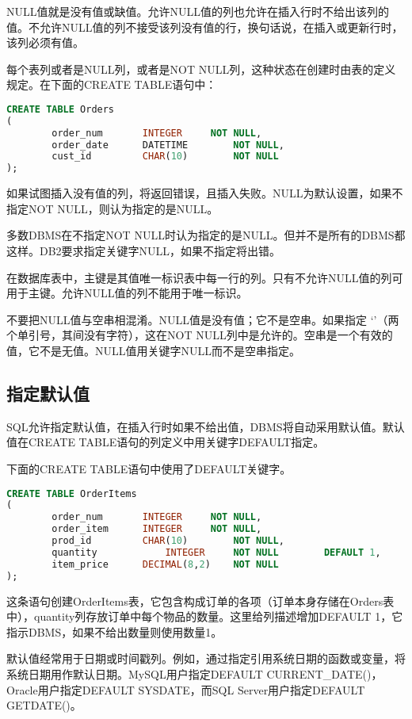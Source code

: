 NULL值就是没有值或缺值。允许NULL值的列也允许在插入行时不给出该列的值。不允许NULL值的列不接受该列没有值的行，换句话说，在插入或更新行时，该列必须有值。

每个表列或者是NULL列，或者是NOT NULL列，这种状态在创建时由表的定义规定。在下面的CREATE TABLE语句中：

\begin{lstlisting}[language=SQL]
CREATE TABLE Orders
(
		order_num		INTEGER		NOT NULL,
		order_date		DATETIME		NOT NULL,
		cust_id			CHAR(10)		NOT NULL
);
\end{lstlisting}

如果试图插入没有值的列，将返回错误，且插入失败。NULL为默认设置，如果不指定NOT NULL，则认为指定的是NULL。

多数DBMS在不指定NOT NULL时认为指定的是NULL。但并不是所有的DBMS都这样。DB2要求指定关键字NULL，如果不指定将出错。

在数据库表中，主键是其值唯一标识表中每一行的列。只有不允许NULL值的列可用于主键。允许NULL值的列不能用于唯一标识。

不要把NULL值与空串相混淆。NULL值是没有值；它不是空串。如果指定 ‘’（两个单引号，其间没有字符），这在NOT NULL列中是允许的。空串是一个有效的值，它不是无值。NULL值用关键字NULL而不是空串指定。

\subsection{指定默认值}


SQL允许指定默认值，在插入行时如果不给出值，DBMS将自动采用默认值。默认值在CREATE TABLE语句的列定义中用关键字DEFAULT指定。

下面的CREATE TABLE语句中使用了DEFAULT关键字。

\begin{lstlisting}[language=SQL]
CREATE TABLE OrderItems
(
		order_num		INTEGER		NOT NULL,
		order_item		INTEGER		NOT NULL,
		prod_id			CHAR(10)		NOT NULL,
		quantity			INTEGER		NOT NULL		DEFAULT	1,
		item_price		DECIMAL(8,2)	NOT NULL
);
\end{lstlisting}

这条语句创建OrderItems表，它包含构成订单的各项（订单本身存储在Orders表中），quantity列存放订单中每个物品的数量。这里给列描述增加DEFAULT 1，它指示DBMS，如果不给出数量则使用数量1。

默认值经常用于日期或时间戳列。例如，通过指定引用系统日期的函数或变量，将系统日期用作默认日期。MySQL用户指定DEFAULT CURRENT\_DATE()，Oracle用户指定DEFAULT SYSDATE，而SQL Server用户指定DEFAULT GETDATE()。

